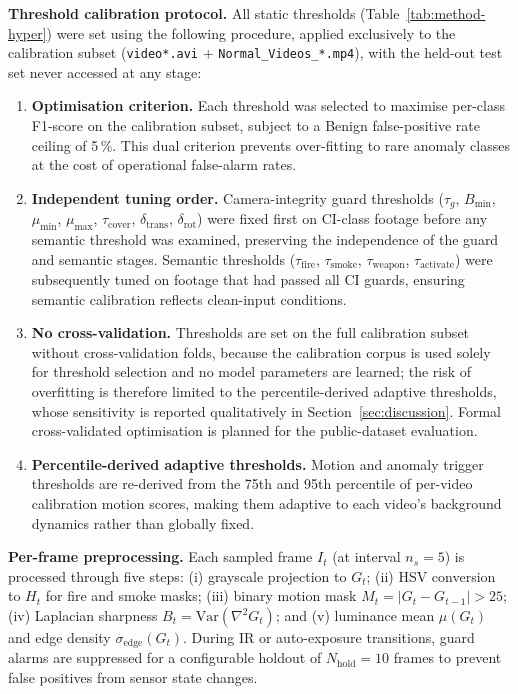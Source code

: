 \documentclass[a4paper,fleqn]{cas-dc}
\begin{document}
\textbf{Threshold calibration protocol.}
All static thresholds (Table~\ref{tab:method-hyper}) were set using the following procedure, applied exclusively to the calibration subset (\texttt{video*.avi} + \texttt{Normal\_Videos\_*.mp4}), with the held-out test set never accessed at any stage:
\begin{enumerate}[leftmargin=2em,itemsep=0pt]
  \item \textbf{Optimisation criterion.} Each threshold was selected to maximise per-class F1-score on the calibration subset, subject to a Benign false-positive rate ceiling of 5\,\%. This dual criterion prevents over-fitting to rare anomaly classes at the cost of operational false-alarm rates.
  \item \textbf{Independent tuning order.} Camera-integrity guard thresholds ($\tau_g$, $B_{\min}$, $\mu_{\min}$, $\mu_{\max}$, $\tau_{\text{cover}}$, $\delta_{\text{trans}}$, $\delta_{\text{rot}}$) were fixed first on CI-class footage before any semantic threshold was examined, preserving the independence of the guard and semantic stages. Semantic thresholds ($\tau_{\text{fire}}$, $\tau_{\text{smoke}}$, $\tau_{\text{weapon}}$, $\tau_{\text{activate}}$) were subsequently tuned on footage that had passed all CI guards, ensuring semantic calibration reflects clean-input conditions.
  \item \textbf{No cross-validation.} Thresholds are set on the full calibration subset without cross-validation folds, because the calibration corpus is used solely for threshold selection and no model parameters are learned; the risk of overfitting is therefore limited to the percentile-derived adaptive thresholds, whose sensitivity is reported qualitatively in Section~\ref{sec:discussion}. Formal cross-validated optimisation is planned for the public-dataset evaluation.
  \item \textbf{Percentile-derived adaptive thresholds.} Motion and anomaly trigger thresholds are re-derived from the 75th and 95th percentile of per-video calibration motion scores, making them adaptive to each video's background dynamics rather than globally fixed.
\end{enumerate}
 
\textbf{Per-frame preprocessing.} Each sampled frame $I_t$ (at interval $n_s = 5$) is processed through five steps: (i) grayscale projection to $G_t$; (ii) HSV conversion to $H_t$ for fire and smoke masks; (iii) binary motion mask $M_t = |G_t - G_{t-1}| > 25$; (iv) Laplacian sharpness $B_t = \mathrm{Var}(\nabla^2 G_t)$; and (v) luminance mean $\mu(G_t)$ and edge density $\sigma_{\text{edge}}(G_t)$. During IR or auto-exposure transitions, guard alarms are suppressed for a configurable holdout of $N_{\text{hold}} = 10$ frames to prevent false positives from sensor state changes.
 
\end{document}

